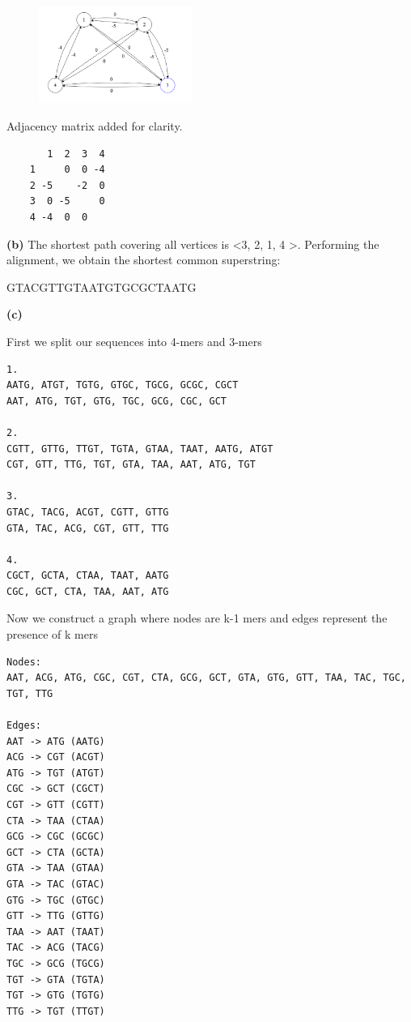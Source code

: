 \documentclass[11pt,letterpaper]{article}
\renewcommand{\part}[1] {\vspace{.10in} {\bf (#1)}}
\begin{document}
\begin{figure}[p]
    \includegraphics[width=5cm]{3a.png}
\end{figure}

Adjacency matrix added for clarity.
\begin{verbatim}
       1  2  3  4
    1     0  0 -4
    2 -5    -2  0
    3  0 -5     0
    4 -4  0  0   
\end{verbatim}

\part{b}
The shortest path covering all vertices is \textless 3, 2, 1, 4 \textgreater.
Performing the alignment, we obtain the shortest common superstring:

    GTACGTTGTAATGTGCGCTAATG

\part{c}

First we split our sequences into 4-mers and 3-mers

\begin{verbatim}
1.
AATG, ATGT, TGTG, GTGC, TGCG, GCGC, CGCT
AAT, ATG, TGT, GTG, TGC, GCG, CGC, GCT

2.
CGTT, GTTG, TTGT, TGTA, GTAA, TAAT, AATG, ATGT
CGT, GTT, TTG, TGT, GTA, TAA, AAT, ATG, TGT

3.
GTAC, TACG, ACGT, CGTT, GTTG
GTA, TAC, ACG, CGT, GTT, TTG

4.
CGCT, GCTA, CTAA, TAAT, AATG
CGC, GCT, CTA, TAA, AAT, ATG
\end{verbatim}

Now we construct a graph where nodes are k-1 mers and edges represent the presence of k mers

\begin{verbatim}
Nodes:
AAT, ACG, ATG, CGC, CGT, CTA, GCG, GCT, GTA, GTG, GTT, TAA, TAC, TGC,
TGT, TTG

Edges:
AAT -> ATG (AATG)
ACG -> CGT (ACGT)
ATG -> TGT (ATGT)
CGC -> GCT (CGCT)
CGT -> GTT (CGTT)
CTA -> TAA (CTAA)
GCG -> CGC (GCGC)
GCT -> CTA (GCTA)
GTA -> TAA (GTAA)
GTA -> TAC (GTAC)
GTG -> TGC (GTGC)
GTT -> TTG (GTTG)
TAA -> AAT (TAAT)
TAC -> ACG (TACG)
TGC -> GCG (TGCG)
TGT -> GTA (TGTA)
TGT -> GTG (TGTG)
TTG -> TGT (TTGT)
\end{verbatim}
\end{document}
